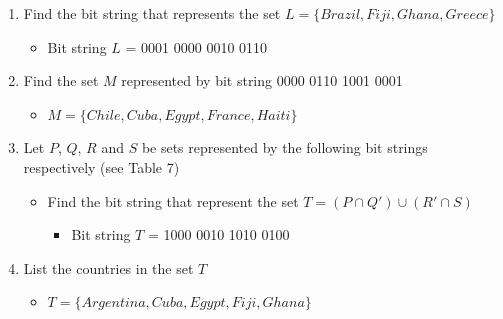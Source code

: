 \documentclass[12pt,a4paper]{article}
\begin{document}
\begin{enumerate}
\item Find the bit string that represents the set $L = \{Brazil, Fiji, Ghana, Greece\}$
	\begin{itemize}
	\item Bit string $L$ = 0001 0000 0010 0110
	\end{itemize}
\item Find the set $M$ represented by bit string 0000 0110 1001 0001
	\begin{itemize}
	\item $M = \{Chile, Cuba, Egypt, France, Haiti\}$
	\end{itemize}
\item Let $P$, $Q$, $R$ and $S$ be sets represented by the following bit strings respectively (see Table 7)
	\begin{itemize}
	\item Find the bit string that represent the set $T = (P \cap Q') \cup (R' \cap S)$
		\begin{itemize}
		\item Bit string $T$ = 1000 0010 1010 0100
		\end{itemize}
	\end{itemize}
\item List the countries in the set $T$
	\begin{itemize}
	\item $T = \{Argentina, Cuba, Egypt, Fiji, Ghana\}$
	\end{itemize}
\end{enumerate}
\end{document}
